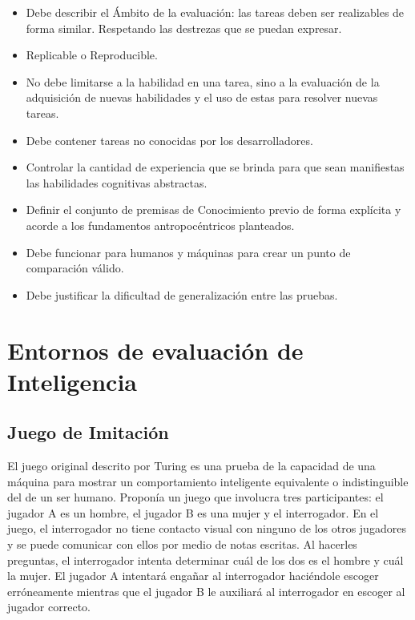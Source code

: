 \begin{itemize}
\item Debe describir el Ámbito de la evaluación: las tareas deben ser realizables de forma similar. Respetando las destrezas que se puedan expresar.
\item Replicable o Reproducible.
\item No debe limitarse a la habilidad en una tarea, sino a la evaluación de la adquisición de nuevas habilidades y el uso de estas para resolver nuevas tareas.
\item Debe contener tareas no conocidas por los desarrolladores.
\item Controlar la cantidad de experiencia que se brinda para que sean manifiestas las habilidades cognitivas abstractas.
\item Definir el conjunto de premisas de Conocimiento previo de forma explícita y acorde a los fundamentos antropocéntricos planteados.
\item Debe funcionar para humanos y máquinas para crear un punto de comparación válido.
\item Debe justificar la dificultad de generalización entre las pruebas.
\end{itemize}

\section{Entornos de evaluación de Inteligencia}\label{section:state-of-the-art:inteligence-evaluation-enviroments}

\subsection{Juego de Imitación}

El juego original descrito por Turing es una prueba de la capacidad de una máquina para mostrar un comportamiento inteligente equivalente o indistinguible del de un ser humano. Proponía un juego que involucra tres participantes: el jugador A es un hombre, el jugador B es una mujer y el interrogador. En el juego, el interrogador no tiene contacto visual con ninguno de los otros jugadores y se puede comunicar con ellos por medio de notas escritas. Al hacerles preguntas, el interrogador intenta determinar cuál de los dos es el hombre y cuál la mujer. El jugador A intentará engañar al interrogador haciéndole escoger erróneamente mientras que el jugador B le auxiliará al interrogador en escoger al jugador correcto. 


